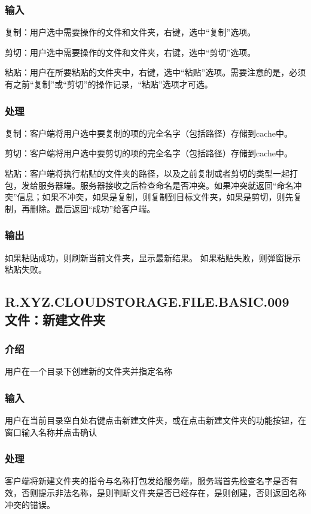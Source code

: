 \subsubsection{输入} 
复制：用户选中需要操作的文件和文件夹，右键，选中“复制”选项。

剪切：用户选中需要操作的文件和文件夹，右键，选中“剪切”选项。

粘贴：用户在所要粘贴的文件夹中，右键，选中“粘贴”选项。需要注意的是，必须有之前“复制”或“剪切”的操作记录，“粘贴”选项才可选。

\subsubsection{处理}
复制：客户端将用户选中要复制的项的完全名字（包括路径）存储到cache中。

剪切：客户端将用户选中要剪切的项的完全名字（包括路径）存储到cache中。

粘贴：客户端将执行粘贴的文件夹的路径，以及之前复制或者剪切的类型一起打包，发给服务器端。服务器接收之后检查命名是否冲突。如果冲突就返回“命名冲突”信息；如果不冲突，如果是复制，则复制到目标文件夹，如果是剪切，则先复制，再删除。最后返回“成功”给客户端。

\subsubsection{输出}
如果粘贴成功，则刷新当前文件夹，显示最新结果。
如果粘贴失败，则弹窗提示粘贴失败。


\subsection{R.XYZ.CLOUDSTORAGE.FILE.BASIC.009 文件：新建文件夹}

\subsubsection{介绍}
用户在一个目录下创建新的文件夹并指定名称

\subsubsection{输入} 
用户在当前目录空白处右键点击新建文件夹，或在点击新建文件夹的功能按钮，在窗口输入名称并点击确认

\subsubsection{处理} 
客户端将新建文件夹的指令与名称打包发给服务端，服务端首先检查名字是否有效，否则提示非法名称，是则判断文件夹是否已经存在，是则创建，否则返回名称冲突的错误。

